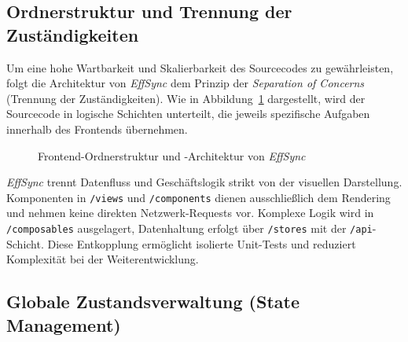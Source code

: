 \subsection{Ordnerstruktur und Trennung der Zuständigkeiten}
\label{sec:frontend_ordnerstruktur}

Um eine hohe Wartbarkeit und Skalierbarkeit des Sourcecodes zu gewährleisten, folgt die Architektur von \textit{EffSync} dem Prinzip der \textit{Separation of Concerns} \cite{parnas1972criteria} (Trennung der Zuständigkeiten). Wie in Abbildung~\ref{fig:frontend_ordner} dargestellt, wird der Sourcecode in logische Schichten unterteilt, die jeweils spezifische Aufgaben innerhalb des Frontends übernehmen.

\begin{figure}[H]    
    \caption{Frontend-Ordnerstruktur und -Architektur von \textit{EffSync}}    
    \label{fig:frontend_ordner}
\end{figure}

\textit{EffSync} trennt Datenfluss und Geschäftslogik strikt von der visuellen Darstellung. Komponenten in \texttt{/views} und \texttt{/components} dienen ausschließlich dem Rendering und nehmen keine direkten Netzwerk-Requests vor. Komplexe Logik wird in \texttt{/composables} ausgelagert, Datenhaltung erfolgt über \texttt{/stores} mit der \texttt{/api}-Schicht. Diese Entkopplung ermöglicht isolierte Unit-Tests\cite{hamza2005separation} und reduziert Komplexität bei der Weiterentwicklung.

\subsection{Globale Zustandsverwaltung (State Management)}
\label{sec:globaler_state}

